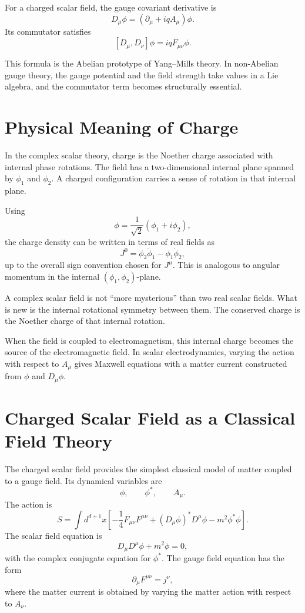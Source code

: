 \begin{definitionbox}
For a charged scalar field, the gauge covariant derivative is
\[
    D_\mu\phi=(\partial_\mu+iqA_\mu)\phi.
\]
Its commutator satisfies
\[
    [D_\mu,D_\nu]\phi=iqF_{\mu\nu}\phi.
\]
\end{definitionbox}

This formula is the Abelian prototype of Yang--Mills theory. In non-Abelian
gauge theory, the gauge potential and the field strength take values in a Lie
algebra, and the commutator term becomes structurally essential.

\section{Physical Meaning of Charge}

In the complex scalar theory, charge is the Noether charge associated with
internal phase rotations. The field has a two-dimensional internal plane
spanned by \(\phi_1\) and \(\phi_2\). A charged configuration carries a sense of
rotation in that internal plane.

Using
\[
    \phi=\frac{1}{\sqrt{2}}(\phi_1+i\phi_2),
\]
the charge density can be written in terms of real fields as
\[
    J^0=\phi_2\dot\phi_1-\phi_1\dot\phi_2,
\]
up to the overall sign convention chosen for \(J^\mu\). This is analogous to
angular momentum in the internal \((\phi_1,\phi_2)\)-plane.

\begin{remarkbox}
A complex scalar field is not ``more mysterious'' than two real scalar fields.
What is new is the internal rotational symmetry between them. The conserved
charge is the Noether charge of that internal rotation.
\end{remarkbox}

When the field is coupled to electromagnetism, this internal charge becomes the
source of the electromagnetic field. In scalar electrodynamics, varying the
action with respect to \(A_\mu\) gives Maxwell equations with a matter current
constructed from \(\phi\) and \(D_\mu\phi\).

\section{Charged Scalar Field as a Classical Field Theory}

The charged scalar field provides the simplest classical model of matter coupled
to a gauge field. Its dynamical variables are
\[
    \phi,\qquad \phi^*,\qquad A_\mu.
\]
The action is
\[
    S=\int d^{d+1}x\left[
        -\frac{1}{4}F_{\mu\nu}F^{\mu\nu}
        +(D_\mu\phi)^*D^\mu\phi
        -m^2\phi^*\phi
    \right].
\]
The scalar field equation is
\[
    D_\mu D^\mu\phi+m^2\phi=0,
\]
with the complex conjugate equation for \(\phi^*\). The gauge field equation has
the form
\[
    \partial_\mu F^{\mu\nu}=j^\nu,
\]
where the matter current is obtained by varying the matter action with respect
to \(A_\nu\).

